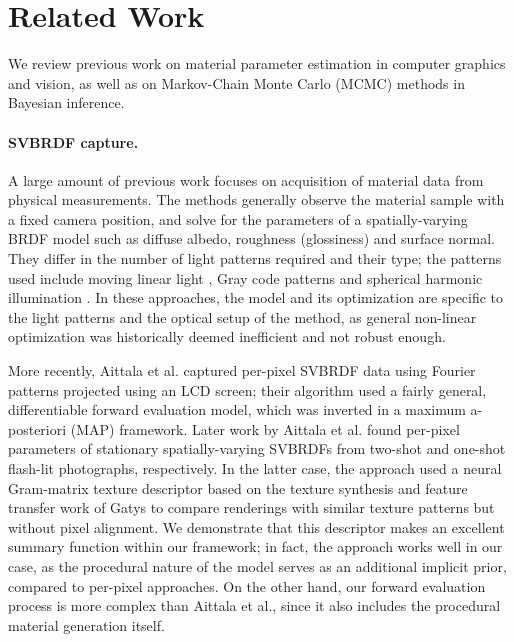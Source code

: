 \section{Related Work}
\label{sec:bayesian:related}

We review previous work on material parameter estimation in computer graphics and vision, as well as on Markov-Chain Monte Carlo (MCMC) methods in Bayesian inference.

\paragraph{SVBRDF capture.} A large amount of previous work focuses on acquisition of material data from physical measurements. The methods generally observe the material sample with a fixed camera position, and solve for the parameters of a spatially-varying BRDF model such as diffuse albedo, roughness (glossiness) and surface normal. They differ in the number of light patterns required and their type; the patterns used include moving linear light \cite{gardner2003linear}, Gray code patterns \cite{francken2009gloss} and spherical harmonic illumination \cite{ghosh2009estimating}. In these approaches, the model and its optimization are specific to the light patterns and the optical setup of the method, as general non-linear optimization was historically deemed  inefficient and not robust enough.

More recently, Aittala et al. \cite{aittala2013practical} captured per-pixel SVBRDF data using Fourier patterns projected using an LCD screen; their algorithm used a fairly general, differentiable forward evaluation model, which was inverted in a maximum a-posteriori (MAP) framework. Later work by Aittala et al. \cite{aittala2015two,aittala2016reflectance} found per-pixel parameters of stationary spatially-varying SVBRDFs from two-shot and one-shot flash-lit photographs, respectively. In the latter case, the approach used a neural Gram-matrix texture descriptor based on the texture synthesis and feature transfer work of Gatys \cite{gatys2015neural,gatys2016image} to compare renderings with similar texture patterns but without pixel alignment. We demonstrate that this descriptor makes an excellent summary function within our framework; in fact, the approach works well in our case, as the procedural nature of the model serves as an additional implicit prior, compared to per-pixel approaches. On the other hand, our forward evaluation process is more complex than Aittala et al., since it also includes the procedural material generation itself.

